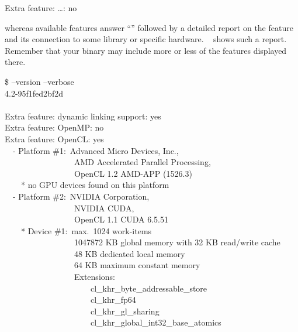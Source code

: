 \begin{literal}
  Extra feature: \dots: no
\end{literal}

whereas available features answer ``'' followed by a detailed report on the feature
and its connection to some library or specific hardware.
\exampleName~ shows such a report.  Remember that your binary
may include more or less of the features displayed there.

\begin{exemplar}
  \begin{maxipage}
    \begin{terminal}
      \$ \app{} --version --verbose \\
        \app{} 4.2-95f1fed2bf2d \\
        ~ \\
        Extra feature: dynamic linking support: yes \\
        Extra feature: OpenMP: no \\
        Extra feature: OpenCL: yes \\
        ~~- Platform \#1:~Advanced Micro Devices, Inc., \\
        ~~~~~~~~~~~~~~~~~AMD Accelerated Parallel Processing, \\
        ~~~~~~~~~~~~~~~~~OpenCL 1.2 AMD-APP (1526.3) \\
        ~~~~* no GPU devices found on this platform \\
        ~~- Platform \#2:~NVIDIA Corporation, \\
        ~~~~~~~~~~~~~~~~~NVIDIA CUDA, \\
        ~~~~~~~~~~~~~~~~~OpenCL 1.1 CUDA 6.5.51 \\
        ~~~~* Device \#1:~max.~1024 work-items \\
        ~~~~~~~~~~~~~~~~~1047872 KB global memory with 32 KB read/write cache \\
        ~~~~~~~~~~~~~~~~~48 KB dedicated local memory \\
        ~~~~~~~~~~~~~~~~~64 KB maximum constant memory \\
        ~~~~~~~~~~~~~~~~~Extensions: \\
        ~~~~~~~~~~~~~~~~~~~~~cl\_khr\_byte\_addressable\_store \\
        ~~~~~~~~~~~~~~~~~~~~~cl\_khr\_fp64 \\
        ~~~~~~~~~~~~~~~~~~~~~cl\_khr\_gl\_sharing \\
        ~~~~~~~~~~~~~~~~~~~~~cl\_khr\_global\_int32\_base\_atomics \\

\end{terminal}
\end{maxipage}
\end{exemplar}

